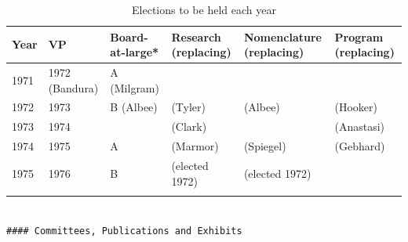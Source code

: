  \begin{longtable}[!t]{ | p{1cm} | p{2cm} | p{1cm} | p{2cm} | p{2cm} | p{2cm} |}
\hline
Year&
VP&
Board-at-large*&
Research (replacing)&
Nomenclature
(replacing)&
Program
(replacing)\\ \hline
1971&
1972 (Bandura)&
A (Milgram)&
&
&
\\
1972&
1973 &
B (Albee)&
(Tyler)&
(Albee)&
(Hooker)\\
1973&
1974&
&
(Clark)&
&
(Anastasi)\\
1974&
1975&
A&
(Marmor)&
(Spiegel)&
(Gebhard)\\
1975&
1976&
B&
(elected 1972)&

(elected 1972)\\ \hline
\caption{Elections to be held each year}
\label{table: elections}
\end{longtable}

\begin{adjustwidth}{2.5em}{2.5em}
\begin{verbatim}

#### Committees, Publications and Exhibits

\end{verbatim}
\end{adjustwidth}


